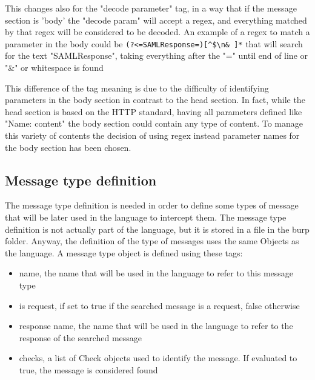 This changes also for the "decode parameter" tag, in a way that if the message section is 'body' the "decode param" will accept a regex, and everything matched by that regex will be considered to be decoded. An example of a regex to match a parameter in the body could be 
\verb|(?<=SAMLResponse=)[^$\n& ]*|
that will search for the text "SAMLResponse", taking everything after the "=" until end of line or "\&" or whitespace is found

This difference of the tag meaning is due to the difficulty of identifying parameters in the body section in contrast to the head section. In fact, while the head section is based on the HTTP standard, having all parameters defined like "Name: content" the body section could contain any type of content. To manage this variety of contents the decision of using regex instead parameter names for the body section has been chosen.

\subsection{Message type definition}
The message type definition is needed in order to define some types of message that will be later used in the language to intercept them.
The message type definition is not actually part of the language, but it is stored in a file in the \Gls{burp} folder. Anyway, the definition of the type of messages uses the same Objects as the language.
A message type object is defined using these tags:
\begin{itemize}
    \item name, the name that will be used in the language to refer to this message type
    \item is request, if set to true if the searched message is a request, false otherwise
    \item response name, the name that will be used in the language to refer to the response of the searched message
    \item checks, a list of Check objects used to identify the message. If evaluated to true, the message is considered found
\end{itemize}

